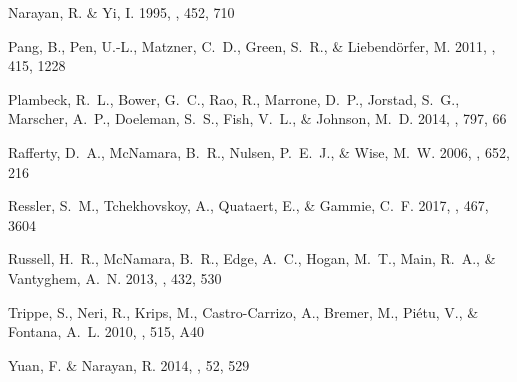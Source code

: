 \documentclass[12pt,preprint]{aastex}
\begin{document}
\begin{thebibliography}{34}
{Narayan}, R. \& {Yi}, I. 1995, \apj, 452, 710

{Pang}, B., {Pen}, U.-L., {Matzner}, C.~D., {Green}, S.~R., \&
  {Liebend{\"o}rfer}, M. 2011, \mnras, 415, 1228

{Plambeck}, R.~L., {Bower}, G.~C., {Rao}, R., {Marrone}, D.~P., {Jorstad},
  S.~G., {Marscher}, A.~P., {Doeleman}, S.~S., {Fish}, V.~L., \& {Johnson},
  M.~D. 2014, \apj, 797, 66

{Rafferty}, D.~A., {McNamara}, B.~R., {Nulsen}, P.~E.~J., \& {Wise}, M.~W.
  2006, \apj, 652, 216

{Ressler}, S.~M., {Tchekhovskoy}, A., {Quataert}, E., \& {Gammie}, C.~F. 2017,
  \mnras, 467, 3604

{Russell}, H.~R., {McNamara}, B.~R., {Edge}, A.~C., {Hogan}, M.~T., {Main},
  R.~A., \& {Vantyghem}, A.~N. 2013, \mnras, 432, 530

{Trippe}, S., {Neri}, R., {Krips}, M., {Castro-Carrizo}, A., {Bremer}, M.,
  {Pi{\'e}tu}, V., \& {Fontana}, A.~L. 2010, \aap, 515, A40

{Yuan}, F. \& {Narayan}, R. 2014, \araa, 52, 529

\end{thebibliography}
\end{document}
